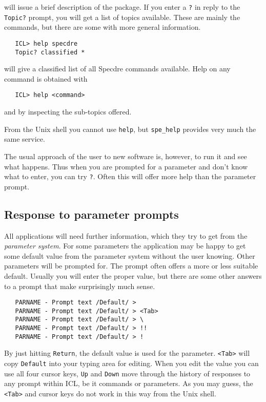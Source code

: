    will issue a brief description of the package. If you enter a {\tt ?}
   in reply to the {\tt Topic?} prompt, you will get a list of topics
   available. These are mainly the commands, but there are some with
   more general information.

\begin{verbatim}
   ICL> help specdre
   Topic? classified *
\end{verbatim}

   will give a classified list of all Specdre commands available. Help
   on any command is obtained with

\begin{verbatim}
   ICL> help <command>
\end{verbatim}

   and by inspecting the sub-topics offered.

   From the Unix shell you cannot use {\tt help}, but {\tt spe\_help}
   provides very much the same service.

   The usual approach of the user to new software is, however, to run it
   and see what happens. Thus when you are prompted for a parameter and
   don't know what to enter, you can try {\tt ?}. Often this will offer
   more help than the parameter prompt.


\subsection{Response to parameter prompts}

   All applications will need further information, which they try to get
   from the {\it parameter system}. For some parameters the application
   may be happy to get some default value from the parameter system
   without the user knowing. Other parameters will be prompted for. The
   prompt often offers a more or less suitable default. Usually you will
   enter the proper value, but there are some other answers to a prompt
   that make surprisingly much sense.

\begin{verbatim}
   PARNAME - Prompt text /Default/ > 
   PARNAME - Prompt text /Default/ > <Tab>
   PARNAME - Prompt text /Default/ > \
   PARNAME - Prompt text /Default/ > !!
   PARNAME - Prompt text /Default/ > !
\end{verbatim}

   By just hitting {\tt Return}, the default value is used for the
   parameter. {\tt <Tab>} will copy {\tt Default} into your typing area
   for editing. When you edit the value you can use all four cursor
   keys, {\tt Up} and {\tt Down} move through the history of responses
   to any prompt within ICL, be it commands or parameters. As you may
   guess, the {\tt <Tab>} and cursor keys do not work in this way from
   the Unix shell.

